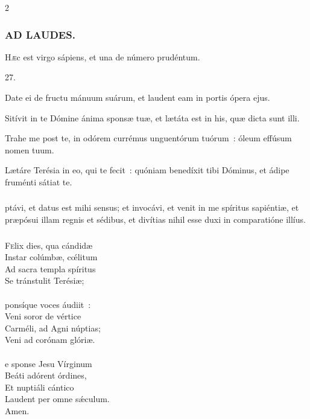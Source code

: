 \documentclass[9pt,twoside]{extarticle}
\begin{document}
\begin{multicols}{2}
{{{\subsubsection*{\center \textsc{AD LAUDES.}}
\begin{center}\end{center}
\lettrine{H}æc est virgo sápiens, et una de número prudéntum. 

\begin{tightlist}{}
\item {} 27.
\item {} Date ei de fructu mánuum suárum, et laudent eam in portis ópera ejus.
\item {} Sitívit in te Dómine ánima sponsæ tuæ, et lætáta est in his, quæ dicta sunt illi.
\item {} Trahe me post te, in odórem currémus unguentórum tuórum~: óleum effúsum nomen tuum.
\item {} Lætáre Terésia in eo, qui te fecit~: quóniam benedíxit tibi Dóminus, et ádipe fruménti sátiat te.
\end{tightlist}

\subsubsection*{\center {}}
ptávi, et datus est mihi sensus; et invocávi, et venit in me spíritus sapiéntiæ, et præpósui illam regnis et sédibus, et divítias nihil esse duxi in comparatióne illíus.

\subsubsection*{\center {}}
\begin{center}\end{center}
\lettrine{F}elix dies, qua cándidæ\\
Instar colúmbæ, cœ́litum\\
Ad sacra templa spíritus\\
Se tránstulit Terésiæ;\\
\\
ponsíque voces áudiit~:\\
Veni soror de vértice\\
Carméli, ad Agni núptias;\\
Veni ad corónam glóriæ.\\
\\
e sponse Jesu Vírginum\\
Beáti adórent órdines,\\
Et nuptiáli cántico\\
Laudent per omne sǽculum.\\
Amen.

}}}
\end{multicols}
\end{document}
